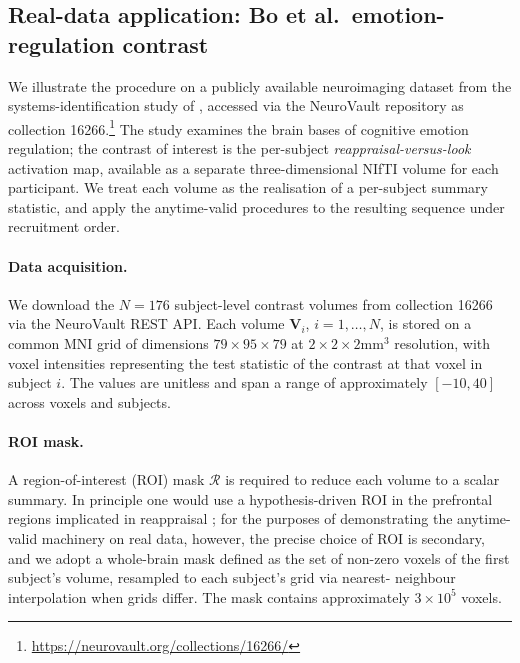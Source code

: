 \documentclass{article}%
\newcommand{\1}{\mathbf{1}}
\begin{document}
\subsection{Real-data application: Bo et al.\ emotion-regulation contrast}
\label{sec:neurovault}
We illustrate the procedure on a publicly available neuroimaging dataset from
the systems-identification study of \cite{bo2024systems}, accessed via the
NeuroVault repository \citep{gorgolewski2015neurovault} as collection
\textsc{16266}.\footnote{\url{https://neurovault.org/collections/16266/}} The
study examines the brain bases of cognitive emotion regulation; the
contrast of interest is the per-subject \emph{reappraisal-versus-look}
activation map, available as a separate three-dimensional NIfTI volume for
each participant. We treat each volume as the realisation of a per-subject
summary statistic, and apply the anytime-valid procedures to the resulting
sequence under recruitment order.

\paragraph{Data acquisition.}
We download the $N = 176$ subject-level contrast volumes from collection \textsc{16266} via the NeuroVault REST API. Each volume $\mathbf{V}_i$, $i = 1,\ldots,N$, is stored on a common MNI grid of dimensions
$79 \times 95 \times 79$ at $2 \times 2 \times 2 \mathrm{mm}^3$ resolution, with voxel intensities representing the test statistic of the contrast at that voxel in subject $i$. The values are unitless and span a range of
approximately $[-10, 40]$ across voxels and subjects.

\paragraph{ROI mask.}
A region-of-interest (ROI) mask $\mathcal{R}$ is required to reduce each volume to a scalar summary. In principle one would use a hypothesis-driven ROI in the prefrontal regions implicated in reappraisal \citep{buhle2014cognitive}; for the purposes of demonstrating the anytime-valid
machinery on real data, however, the precise choice of ROI is secondary, and we adopt a whole-brain mask defined as the set of non-zero voxels of the first subject's volume, resampled to each subject's grid via nearest-
neighbour interpolation when grids differ. The mask contains approximately
$3 \times 10^5$ voxels.
\end{document}

